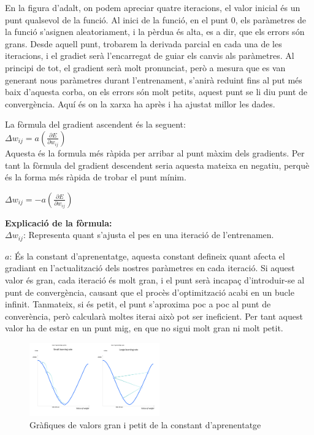 En la figura d'adalt, on podem apreciar quatre iteracions, el valor inicial és un punt qualsevol de la funció. Al inici de la funció, en el punt 0, els paràmetres de la funció s'asignen aleatoriament, i la pèrdua és alta, es a dir, que els errors són grans. Desde aquell punt, trobarem la derivada parcial en cada una de les iteracions, i el gradiet serà l'encarregat de guiar els canvis als paràmetres.
Al principi de tot, el gradient serà molt pronunciat, però a mesura que es van generant nous paràmetres durant l'entrenament, s'anirà reduint fins al put més baix d'aquesta corba, on els errors són molt petits, aquest punt se li diu punt de convergència. Aquí és on la xarxa ha après i ha ajustat millor les dades.

La fòrmula del gradient ascendent és la seguent: \\

$\Delta w_{ij} = a \left( \frac{\partial E}{\partial w_{ij}} \right)$ \\

Aquesta és la formula més ràpida per arribar al punt màxim dels gradients. Per tant la fòrmula del gradient descendent seria aquesta mateixa en negatiu, perquè és la forma més ràpida de trobar el punt mínim.

$\Delta w_{ij} = -a \left( \frac{\partial E}{\partial w_{ij}} \right)$

\textbf{Explicació de la fòrmula:}\\
$\Delta w_{ij}$: Representa quant s'ajusta el pes en una iteració de l'entrenamen.

$a$: És la constant d'aprenentatge, aquesta constant defineix quant afecta el gradiant en l'actualització dels nostres paràmetres en cada iteració. Si aquest valor és gran, cada iteració és molt gran, i el punt serà incapaç d'introduir-se al punt de convergència, causant que el procès d'optimització acabi en un bucle infinit. Tanmateix, si és petit, el punt s'aproxima poc a poc al punt de converència, però calcularà moltes iterai això pot ser ineficient. Per tant aquest valor ha de estar en un punt mig, en que no sigui molt gran ni molt petit.

\begin{figure}[H]
    \centering
    \includegraphics[width=0.5\textwidth]{./figures/constant_gradient.png}
    \caption{Gràfiques de valors gran i petit de la constant d'aprenentatge}
\end{figure}


